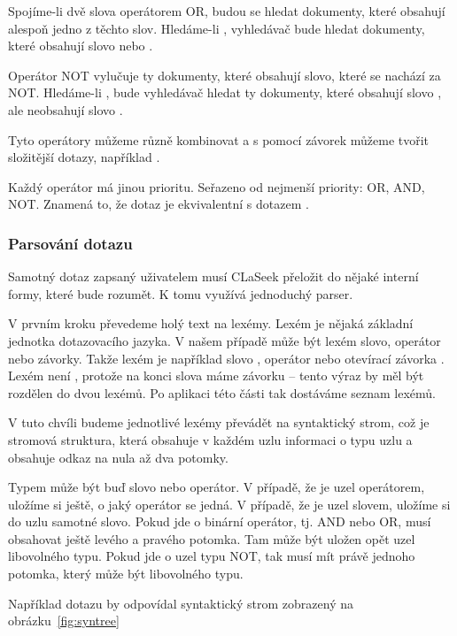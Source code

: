 \documentclass[12pt]{article}
\newcommand{\name}{CLaSeek}
\newcommand{\sssection}[1]{\subsubsection{#1}}
\begin{document}
Spojíme-li dvě slova operátorem OR, budou se hledat dokumenty, které obsahují alespoň jedno z těchto slov. Hledáme-li , vyhledávač bude hledat dokumenty, které obsahují slovo  nebo .

Operátor NOT vylučuje ty dokumenty, které obsahují slovo, které se nachází za NOT. Hledáme-li , bude vyhledávač hledat ty dokumenty, které obsahují slovo , ale neobsahují slovo . 

Tyto operátory můžeme různě kombinovat a s pomocí závorek můžeme tvořit složitější dotazy, například . 

Každý operátor má jinou prioritu. Seřazeno od nejmenší priority: OR, AND, NOT. Znamená to, že dotaz  je ekvivalentní s dotazem .

\sssection{Parsování dotazu}

Samotný dotaz zapsaný uživatelem musí \name{} přeložit do nějaké interní formy, které bude rozumět. K tomu využívá jednoduchý parser. 

V prvním kroku převedeme holý text na lexémy. Lexém je nějaká základní jednotka dotazovacího jazyka. V našem případě může být lexém slovo, operátor nebo závorky. Takže lexém je například slovo , operátor  nebo otevírací závorka \uv{(}. Lexém není , protože na konci slova máme závorku -- tento výraz by měl být rozdělen do dvou lexémů. Po aplikaci této části tak dostáváme seznam lexémů. 

V tuto chvíli budeme jednotlivé lexémy převádět na syntaktický strom, což je stromová struktura, která obsahuje v každém uzlu informaci o typu uzlu a obsahuje odkaz na nula až dva potomky. 

Typem může být buď slovo nebo operátor. V případě, že je uzel operátorem, uložíme si ještě, o jaký operátor se jedná. V případě, že je uzel slovem, uložíme si do uzlu samotné slovo. Pokud jde o binární operátor, tj. AND nebo OR, musí obsahovat ještě levého a pravého potomka. Tam může být uložen opět uzel libovolného typu. Pokud jde o uzel typu NOT, tak musí mít právě jednoho potomka, který může být libovolného typu. 

Například dotazu  by odpovídal syntaktický strom zobrazený na obrázku~\ref{fig:syntree}
\end{document}
